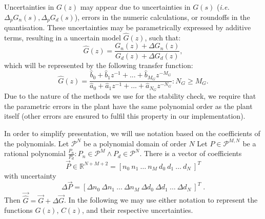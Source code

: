 \documentclass{sig-alternate-05-2015}
\begin{document}
Uncertainties in $G(z)$ may appear due to uncertainties in $G(s)$
(\emph{i.e.} $\Delta_p{G}_n(s),\Delta_p{G}_d(s)$), errors in the numeric
calculations, or roundoffs in the quantisation.  These uncertainties may be
parametrically expressed by additive terms, resulting in a uncertain model
$\hat{G}(z)$, such that:
%
\begin{equation}
\hat{G}(z)=\frac{G_n(z)+\Delta G_n(z)}{G_d(z)+\Delta G_d(z)},
\end{equation}
%
which will be represented by the following transfer function:
%
\begin{equation}
\hat{G}(z)=\frac{\hat{b}_{0}+\hat{b}_{1}z^{-1}+...+\hat{b}_{M_G}z^{-M_G}}{\hat{a}_{0}+\hat{a}_{1}z^{-1}+...+\hat{a}_{N_G}z^{-N_G}} : N_G \geq M_G .
\end{equation}
%
Due to the nature of the methods we use for the stability check, we require
that the parametric errors in the plant have the same polynomial order as
the plant itself (other errors are ensured to fulfil this property in our
implementation).

In order to simplify presentation, we will use notation based on the
coefficients of the polynomials.  Let $\mathcal{P}^{N}$ be a polynomial
domain of order $N$ Let $P \in \mathcal{P}^{M,N}$ be a rational polynomial
$\frac{P_n}{P_d} : P_n \in \mathcal{P}^{M} \wedge P_d \in \mathcal{P}^{N}$. 
There is a vector of coefficients
%
\begin{equation}
\vec{P} \in \mathbb{R}^{N+M+2}=[n_{0}\ n_{1}\ \hdots \ n_{M}\ d_{0}\ d_{1}\ \hdots\ d_{N}\ ]^T
\label{eq:coefficients}
\end{equation}
%
with uncertainty
%
\begin{equation}
\Delta{\vec{P}}=[\Delta{n}_{0}\ \Delta{n}_{1}\ \hdots \ \Delta{n}_{M}\ \Delta{d}_{0}\ \Delta{d}_{1}\ \hdots\ \Delta{d}_{N}\ ]^T \;.
\label{eq:coefficients}
\end{equation}
%
Then $\vec{\hat{G}}=\vec{G}+\Delta{\vec{G}}$.  In the following we may use
either notation to represent the functions $G(z)$, $C(z)$, and their
respective uncertainties.\\

\end{document}
